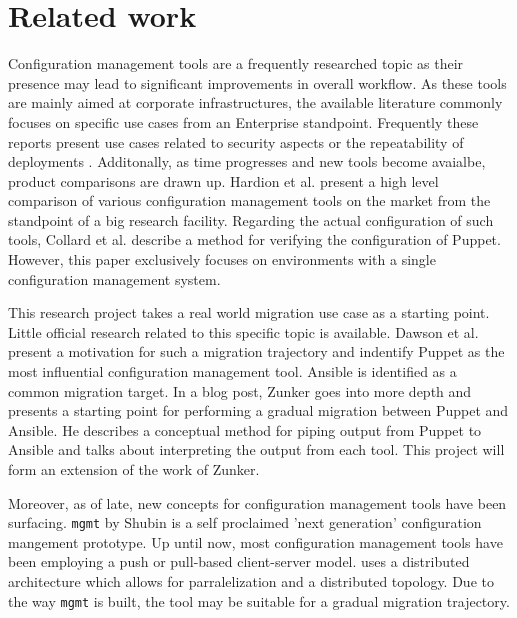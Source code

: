 \section{Related work} \label{related}
Configuration management tools are a frequently researched topic as their presence may lead to significant improvements in overall workflow. As these tools are mainly aimed at corporate infrastructures, the available literature commonly focuses on specific use cases from an Enterprise standpoint. Frequently these reports present use cases related to security aspects \cite{dotson2014security} or the repeatability of deployments \cite{ruiz2015reconstructable}. Additonally, as time progresses and new tools become avaialbe, product comparisons are drawn up. Hardion et al. \cite{Hardion2013} present a high level comparison of various configuration management tools on the market from the standpoint of a big research facility. Regarding the actual configuration of such tools, Collard et al. \cite{Collard2015} describe a method for verifying the configuration of Puppet. However, this paper exclusively focuses on environments with a single configuration management system. 

This research project takes a real world migration use case as a starting point. Little official research related to this specific topic is available. Dawson et al. \cite{dawson_hall_hecht_2014} present a motivation for such a migration trajectory and indentify Puppet as the most influential configuration management tool. Ansible is identified as a common migration target. In a blog post, Zunker \cite{zunker_2014} goes into more depth and presents a starting point for performing a gradual migration between Puppet and Ansible. He describes a conceptual method for piping output from Puppet to Ansible and talks about interpreting the output from each tool. This project will form an extension of the work of Zunker.   

Moreover, as of late, new concepts for configuration management tools have been surfacing. \texttt{mgmt} by Shubin \cite{shubin2016} is a self proclaimed 'next generation' configuration mangement prototype.  Up until now, most configuration management tools have been employing a push or pull-based client-server model.  uses a distributed architecture which allows for parralelization and a distributed topology. Due to the way \texttt{mgmt} is built, the tool may be suitable for a gradual migration trajectory. 
